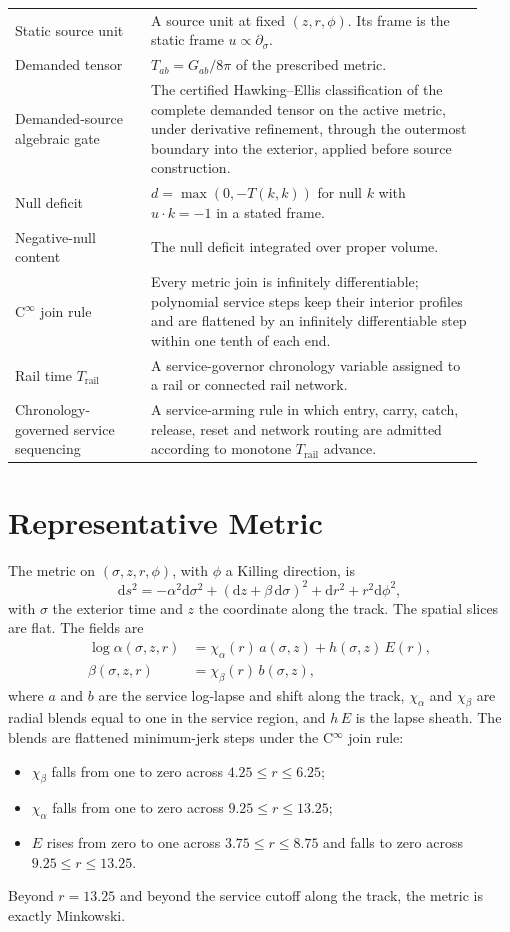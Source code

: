 \documentclass[11pt]{article}
\newcommand{\dd}{\mathrm{d}}
\newcommand{\sig}{\sigma}
\begin{document}
\begin{longtable}{L{0.27\linewidth}L{0.66\linewidth}}
Static source unit & A source unit at fixed $(z,r,\phi)$. Its frame is the static frame $u\propto\partial_\sig$. \\
Demanded tensor & $T_{ab}=G_{ab}/8\pi$ of the prescribed metric. \\
Demanded-source algebraic gate & The certified Hawking--Ellis classification of the complete demanded tensor on the active metric, under derivative refinement, through the outermost boundary into the exterior, applied before source construction. \\
Null deficit & $d=\max(0,-T(k,k))$ for null $k$ with $u\cdot k=-1$ in a stated frame. \\
Negative-null content & The null deficit integrated over proper volume. \\
C$^\infty$ join rule & Every metric join is infinitely differentiable; polynomial service steps keep their interior profiles and are flattened by an infinitely differentiable step within one tenth of each end. \\
Rail time $T_{\mathrm{rail}}$ & A service-governor chronology variable assigned to a rail or connected rail network. \\
Chronology-governed service sequencing & A service-arming rule in which entry, carry, catch, release, reset and network routing are admitted according to monotone $T_{\mathrm{rail}}$ advance. \\
\bottomrule
\end{longtable}

\section{Representative Metric}

The metric on $(\sig,z,r,\phi)$, with $\phi$ a Killing direction, is
\begin{equation}
\dd s^2=-\alpha^2\dd\sig^2+(\dd z+\beta\,\dd\sig)^2+\dd r^2+r^2\dd\phi^2 ,
\label{eq:metric}
\end{equation}
with $\sig$ the exterior time and $z$ the coordinate along the track. The spatial slices are flat. The fields are
\begin{align}
\log\alpha(\sig,z,r)&=\chi_\alpha(r)\,a(\sig,z)+h(\sig,z)\,E(r),\\
\beta(\sig,z,r)&=\chi_\beta(r)\,b(\sig,z),
\end{align}
where $a$ and $b$ are the service log-lapse and shift along the track, $\chi_\alpha$ and $\chi_\beta$ are radial blends equal to one in the service region, and $h\,E$ is the lapse sheath. The blends are flattened minimum-jerk steps under the C$^\infty$ join rule:
\begin{itemize}
\item $\chi_\beta$ falls from one to zero across $4.25\le r\le6.25$;
\item $\chi_\alpha$ falls from one to zero across $9.25\le r\le13.25$;
\item $E$ rises from zero to one across $3.75\le r\le8.75$ and falls to zero across $9.25\le r\le13.25$.
\end{itemize}
Beyond $r=13.25$ and beyond the service cutoff along the track, the metric is exactly Minkowski.
\end{document}

